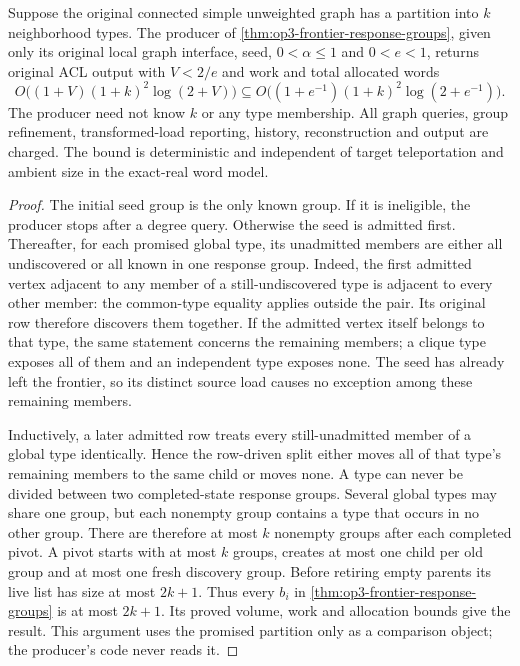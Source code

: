 \begin{theorem}
\label{thm:op3-local-neighborhood-types}
Suppose the original connected simple unweighted graph has a partition
into $k$ neighborhood types. The producer of
\cref{thm:op3-frontier-response-groups}, given only its original local
graph interface, seed, $0<\alpha\leq1$ and $0<e<1$, returns original
ACL output with $V<2/e$ and work and total allocated words
\[
 O\bigl((1+V)(1+k)^2\log(2+V)\bigr)
 \subseteq O\bigl((1+e^{-1})(1+k)^2\log(2+e^{-1})\bigr).
\]
The producer need not know $k$ or any type membership. All graph queries,
group refinement, transformed-load reporting, history, reconstruction and
output are charged. The bound is deterministic and independent of target
teleportation and ambient size in the exact-real word model.
\end{theorem}
\begin{proof}
The initial seed group is the only known group. If it is ineligible, the
producer stops after a degree query. Otherwise the seed is admitted first.
Thereafter, for each promised global type, its unadmitted members are either
all undiscovered or all known in one response group. Indeed, the first
admitted vertex adjacent to any member of a still-undiscovered type is
adjacent to every other member: the common-type equality applies outside
the pair. Its original row therefore discovers them together. If the
admitted vertex itself belongs to that type, the same statement concerns
the remaining members; a clique type exposes all of them and an independent
type exposes none. The seed has already left the frontier, so its distinct
source load causes no exception among these remaining members.

Inductively, a later admitted row treats every still-unadmitted member of
a global type identically. Hence the row-driven split either moves all of
that type's remaining members to the same child or moves none. A type can
never be divided between two completed-state response groups. Several
global types may share one group, but each nonempty group contains a type
that occurs in no other group. There are therefore at most $k$ nonempty
groups after each completed pivot. A pivot starts with at most $k$ groups,
creates at most one child per old group and at most one fresh discovery
group. Before retiring empty parents its live list has size at most
$2k+1$. Thus every $b_i$ in
\cref{thm:op3-frontier-response-groups} is at most $2k+1$.
Its proved volume, work and allocation bounds give the result. This
argument uses the promised partition only as a comparison object; the
producer's code never reads it.
\end{proof}

